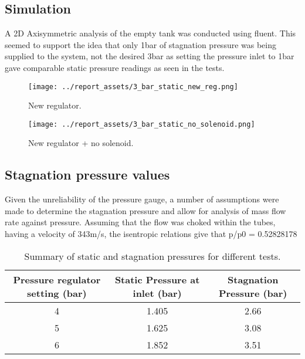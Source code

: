 \subsection{Simulation}
A 2D Axisymmetric analysis of the empty tank was conducted using fluent. This seemed to support the idea that only 1bar of stagnation pressure was being supplied to the system, not the desired 3bar as setting the pressure inlet to 1bar gave comparable static pressure readings as seen in the tests.
\begin{figure}[htbp]
    \centering

    \begin{minipage}{0.45\textwidth}
        \centering
        \texttt{[image: ../report\_assets/3\_bar\_static\_new\_reg.png]}
        \caption{New regulator.}\label{fig:static-pressure-drop-fluent}
    \end{minipage}
    \hfill
    \begin{minipage}{0.45\textwidth}
        \centering
        \texttt{[image: ../report\_assets/3\_bar\_static\_no\_solenoid.png]}
        \caption{New regulator + no solenoid.}\label{fig:static-pressure-drop-report}
    \end{minipage}

\end{figure}

\subsection{Stagnation pressure values}
Given the unreliability of the pressure gauge, a number of assumptions were made to determine the stagnation pressure and allow for analysis of mass flow rate against pressure. Assuming that the flow was choked within the tubes, having a velocity of 343m/s, the isentropic relations give that p/p0 =  0.52828178
\begin{table}[htbp]
    \centering
    \begin{tabular}{|c|c|c|}
        \hline
        Pressure regulator setting (bar) & Static Pressure at inlet (bar) &  Stagnation Pressure (bar) \\
        \hline
        4 & 1.405 & 2.66 \\
        5 & 1.625 & 3.08 \\
        6 & 1.852 & 3.51 \\
        \hline
    \end{tabular}
    \caption{Summary of static and stagnation pressures for different tests.}
    \label{tab:static-stag-pressures}
\end{table}

